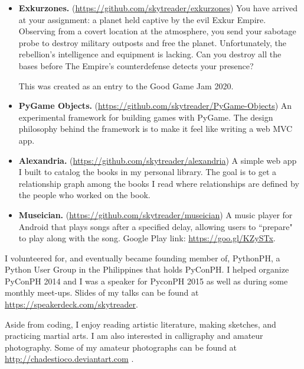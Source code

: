 \documentclass{article}
\begin{document}
    \begin{itemize}
      \item \textbf{Exkurzones.} (\url{https://github.com/skytreader/exkurzones})
      You have arrived at your assignment: a planet held captive by the evil Exkur Empire.
      Observing from a covert location at the atmosphere, you send your sabotage probe to
      destroy military outposts and free the planet. Unfortunately, the rebellion's
      intelligence and equipment is lacking. Can you destroy all the bases before
      The Empire's counterdefense detects your presence?

      This was created as an entry to the Good Game Jam 2020.
      

      \item \textbf{PyGame Objects.} (\url{https://github.com/skytreader/PyGame-Objects})
      An experimental framework for building games with PyGame. The design philosophy behind the framework
      is to make it feel like writing a web MVC app.


      \item \textbf{Alexandria.} (\url{https://github.com/skytreader/alexandria})
      A simple web app I built to catalog the books in my personal library. The goal is to
      get a relationship graph among the books I read where relationships are defined
      by the people who worked on the book.


      \item \textbf{Museician.} (\url{https://github.com/skytreader/museician})
      A music player for Android that plays songs after a specified delay, allowing
      users to ``prepare" to play along with the song. Google Play link:
      \url{https://goo.gl/KZySTx}.

    \end{itemize}

  \breather
  I volunteered for, and eventually became founding member of, PythonPH, a Python User Group in the Philippines that holds PyConPH. I helped organize PyConPH 2014 and
  I was a speaker for PyconPH 2015 as well as during some monthly meet-ups. Slides of my talks can be found at \url{https://speakerdeck.com/skytreader}.

  Aside from coding, I enjoy reading artistic literature, making sketches, and practicing martial arts. I am also interested in
  calligraphy and amateur photography. Some of my amateur photographs can be found at \url{http://chadestioco.deviantart.com} .
  
\end{document}
